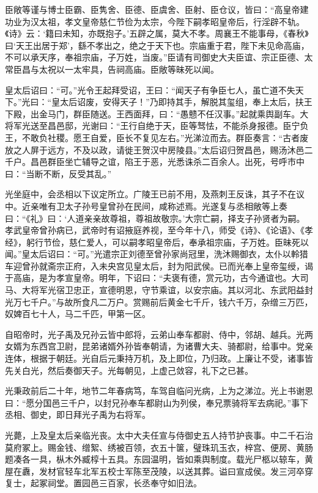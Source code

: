 \documentclass[12pt,UTF8]{ctexbook}
\begin{document}
臣敞等谨与博士臣霸、臣隽舍、臣德、臣虞舍、臣射、臣仓议，皆曰：“高皇帝建功业为汉太祖，孝文皇帝慈仁节俭为太宗，今陛下嗣孝昭皇帝后，行淫辟不轨。《诗》云：‘籍曰未知，亦既抱子。’五辟之属，莫大不孝。周襄王不能事母，《春秋》曰‘天王出居于郑’，繇不孝出之，绝之于天下也。宗庙重于君，陛下未见命高庙，不可以承天序，奉祖宗庙，子万姓，当废。”臣请有司御史大夫臣谊、宗正臣德、太常臣昌与太祝以一太牢具，告祠高庙。臣敞等昧死以闻。



皇太后诏曰：“可。”光令王起拜受诏，王曰：“闻天子有争臣七人，虽亡道不失天下。”光曰：“皇太后诏废，安得天子！”乃即持其手，解脱其玺组，奉上太后，扶王下殿，出金马门，群臣随送。王西面拜，曰：“愚戆不任汉事。”起就乘舆副车。大将军光送至昌邑邸，光谢曰：“王行自绝于天，臣等驽怯，不能杀身报德。臣宁负王，不敢负社稷。愿王自爱，臣长不复见左右。”光涕泣而去。群臣奏言：“古者废放之人屏于远方，不及以政，请徙王贺汉中房陵县。”太后诏归贺昌邑，赐汤沐邑二千户。昌邑群臣坐亡辅导之谊，陷王于恶，光悉诛杀二百余人。出死，号呼市中曰：“当断不断，反受其乱。”



光坐庭中，会丞相以下议定所立。广陵王已前不用，及燕刺王反诛，其子不在议中。近亲唯有卫太子孙号皇曾孙在民间，咸称述焉。光遂复与丞相敞等上奏曰：“《礼》曰：‘人道亲亲故尊祖，尊祖故敬宗。’大宗亡嗣，择支子孙贤者为嗣。孝武皇帝曾孙病已，武帝时有诏掖庭养视，至今年十八，师受《诗》、《论语》、《孝经》，躬行节俭，慈仁爱人，可以嗣孝昭皇帝后，奉承祖宗庙，子万姓。臣昧死以闻。”皇太后诏曰：“可。”光遣宗正刘德至曾孙家尚冠里，洗沐赐御衣，太仆以軨猎车迎曾孙就斋宗正府，入未央宫见皇太后，封为阳武侯。已而光奉上皇帝玺绶，谒于高庙，是为孝宣皇帝。明年，下诏曰：“夫褒有德，赏元功，古今通谊也。大司马、大将军光宿卫忠正，宣德明恩，守节乘谊，以安宗庙。其以河北、东武阳益封光万七千户。”与故所食凡二万户。赏赐前后黄金七千斤，钱六千万，杂缯三万匹，奴婢百七十人，马二千匹，甲第一区。



自昭帝时，光子禹及兄孙云皆中郎将，云弟山奉车都尉、侍中，邻胡、越兵。光两女婿为东西宫卫尉，昆弟诸婿外孙皆奉朝请，为诸曹大夫、骑都尉，给事中。党亲连体，根据于朝廷。光自后元秉持万机，及上即位，乃归政。上廉让不受，诸事皆先关白光，然后奏御天子。光每朝见，上虚己敛容，礼下之已甚。



光秉政前后二十年，地节二年春病笃，车驾自临问光病，上为之涕泣。光上书谢恩曰：“愿分国邑三千户，以封兄孙奉车都尉山为列侯，奉兄票骑将军去病祀。”事下丞相、御史，即日拜光子禹为右将军。



光薨，上及皇太后亲临光丧。太中大夫任宣与侍御史五人持节护丧事。中二千石治莫府冢上。赐金钱、缯絮、绣被百领，衣五十箧，璧珠玑玉衣，梓宫、便房、黄肠题凑各一具，枞木外臧椁十五具。东园温明，皆如乘舆制度。载光尸柩以辌车，黄屋在纛，发材官轻车北军五校士军陈至茂陵，以送其葬。谥曰宣成侯。发三河卒穿复士，起冢祠堂。置园邑三百家，长丞奉守如旧法。
\end{document}
